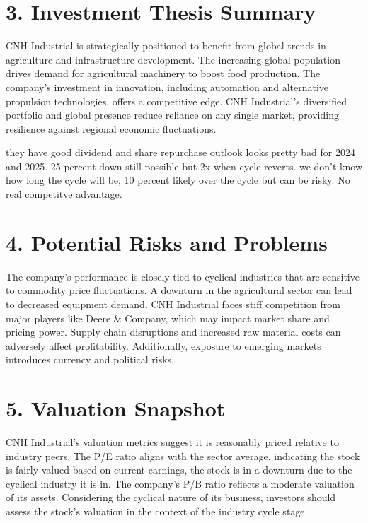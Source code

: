 \documentclass[12pt]{article}
\begin{document}
\section*{3. Investment Thesis Summary}
CNH Industrial is strategically positioned to benefit from global trends in agriculture and infrastructure development. The increasing global population drives demand for agricultural machinery to boost food production. The company's investment in innovation, including automation and alternative propulsion technologies, offers a competitive edge. CNH Industrial's diversified portfolio and global presence reduce reliance on any single market, providing resilience against regional economic fluctuations.

they have good dividend and share repurchase outlook looks pretty bad for 2024 and 2025. 25 percent down still possible but 2x when cycle reverts. we don't know how long the cycle will be, 10 percent likely over the cycle but can be risky. No real competitve advantage.

\section*{4. Potential Risks and Problems}
The company's performance is closely tied to cyclical industries that are sensitive to commodity price fluctuations. A downturn in the agricultural sector can lead to decreased equipment demand. CNH Industrial faces stiff competition from major players like Deere \& Company, which may impact market share and pricing power. Supply chain disruptions and increased raw material costs can adversely affect profitability. Additionally, exposure to emerging markets introduces currency and political risks.

\section*{5. Valuation Snapshot}
CNH Industrial's valuation metrics suggest it is reasonably priced relative to industry peers. The P/E ratio aligns with the sector average, indicating the stock is fairly valued based on current earnings, the stock is in a downturn due to the cyclical industry it is in. The company's P/B ratio reflects a moderate valuation of its assets. Considering the cyclical nature of its business, investors should assess the stock's valuation in the context of the industry cycle stage.
\end{document}
